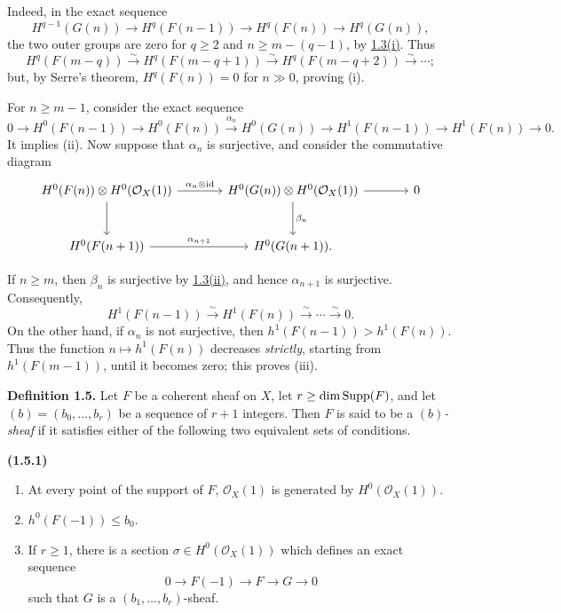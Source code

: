 Indeed, in the exact sequence
\[
  H^{q-1}(G(n))\longrightarrow H^q(F(n-1))
  \longrightarrow H^q(F(n))\longrightarrow H^q(G(n)),
\]
the two outer groups are zero for \(q\geq2\) and
\(n\geq m-(q-1)\), by \hyperlink{sga6.e13.prop.1-3}{1.3(i)}. Thus
\[
  H^q(F(m-q))\xrightarrow{\sim}H^q(F(m-q+1))
  \xrightarrow{\sim}H^q(F(m-q+2))\xrightarrow{\sim}\cdots;
\]
but, by Serre's theorem, \(H^q(F(n))=0\) for \(n\gg0\), proving (i).

For \(n\geq m-1\), consider the exact sequence
\[
  0\to H^0(F(n-1))\to H^0(F(n))
  \xrightarrow{\alpha_n}H^0(G(n))\to H^1(F(n-1))
  \to H^1(F(n))\to0.
\]
It implies (ii). Now suppose that \(\alpha_n\) is surjective, and consider
the commutative diagram
\[
\begin{tikzcd}[column sep=large,row sep=large]
H^0(F(n))\otimes H^0(\mathcal O_X(1))
  \arrow[r,"\alpha_n\otimes\mathrm{id}"]
  \arrow[d]
& H^0(G(n))\otimes H^0(\mathcal O_X(1))
  \arrow[r]
  \arrow[d,"\beta_n"]
& 0 \\
H^0(F(n+1))
  \arrow[r,"\alpha_{n+1}"]
& H^0(G(n+1)).
\end{tikzcd}
\]

\newpage
If \(n\geq m\), then \(\beta_n\) is surjective by \hyperlink{sga6.e13.prop.1-3}{1.3(ii)}, and hence
\(\alpha_{n+1}\) is surjective. Consequently,
\[
  H^1(F(n-1))\xrightarrow{\sim}H^1(F(n))
  \xrightarrow{\sim}\cdots\xrightarrow{\sim}0.
\]
On the other hand, if \(\alpha_n\) is not surjective, then
\(h^1(F(n-1))>h^1(F(n))\). Thus the function
\(n\longmapsto h^1(F(n))\) decreases \emph{strictly}, starting from
\(h^1(F(m-1))\), until it becomes zero; this proves (iii).

\textbf{Definition 1.5.} Let \(F\) be a coherent sheaf on \(X\), let
\(r\geq\dim\operatorname{Supp}(F)\), and let \((b)=(b_0,\ldots,b_r)\) be a sequence of
\(r+1\) integers. Then \(F\) is said to be a \emph{\((b)\)-sheaf} if it
satisfies either of the following two equivalent sets of conditions.

\noindent{}\textbf{(1.5.1)}
\begin{enumerate}[label=(\roman*)]
\item At every point of the support of \(F\), \(\mathcal O_X(1)\) is
generated by \(H^0(\mathcal O_X(1))\).
\item \(h^0(F(-1))\leq b_0\).
\item If \(r\geq1\), there is a section
\(\sigma\in H^0(\mathcal O_X(1))\) which defines an exact sequence
\[
  0\longrightarrow F(-1)\longrightarrow F\longrightarrow G\longrightarrow0
\]
such that \(G\) is a \((b_1,\ldots,b_r)\)-sheaf.
\end{enumerate}

